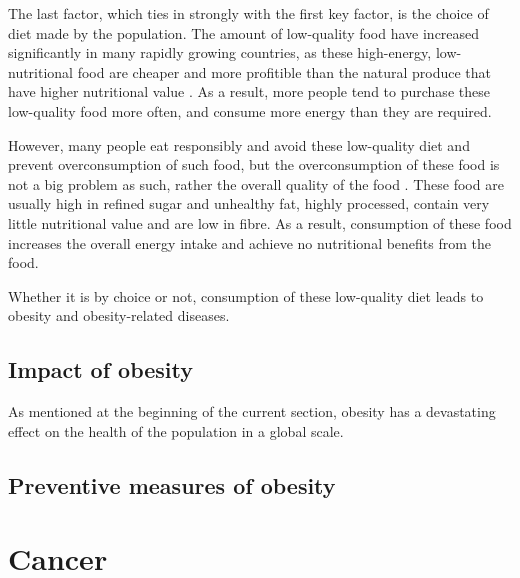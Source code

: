 \noindent
The last factor, which ties in strongly with the first key factor, is the choice of diet made by the population.
The amount of low-quality food have increased significantly in many rapidly growing countries, as these high-energy, low-nutritional food are cheaper and more profitible than the natural produce that have higher nutritional value \citep{Kearney2010}.
As a result, more people tend to purchase these low-quality food more often, and consume more energy than they are required.

However, many people eat responsibly and avoid these low-quality diet and prevent overconsumption of such food, but the overconsumption of these food is not a big problem as such, rather the overall quality of the food \citep{Malik2013}.
These food are usually high in refined sugar and unhealthy fat, highly processed, contain very little nutritional value and are low in fibre.
As a result, consumption of these food increases the overall energy intake and achieve no nutritional benefits from the food.

Whether it is by choice or not, consumption of these low-quality diet leads to obesity and obesity-related diseases. \\



\subsection{Impact of obesity}
\label{sub:impact_of_obesity}

As mentioned at the beginning of the current section, obesity has a devastating effect on the health of the population in a global scale.


\citep{Malik2013, Franks2010}




\subsection{Preventive measures of obesity}
\label{sub:preventive_measures_of_obesity}




\citep{Malik2013}




\section{Cancer}
\label{sec:cancer}

